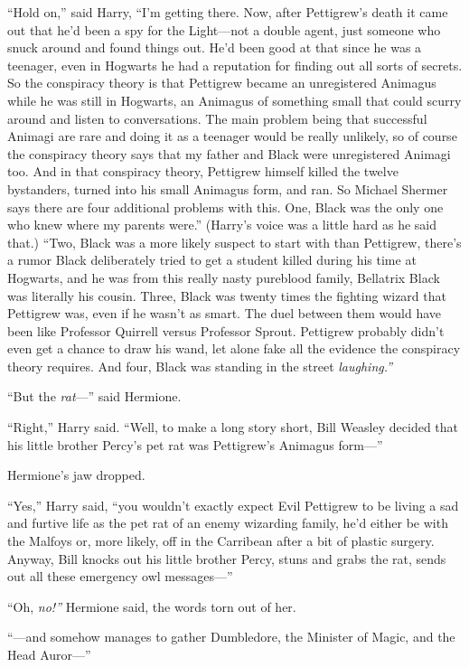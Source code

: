``Hold on,'' said Harry, ``I'm getting there. Now, after Pettigrew's
death it came out that he'd been a spy for the Light---not a double
agent, just someone who snuck around and found things out. He'd been
good at that since he was a teenager, even in Hogwarts he had a
reputation for finding out all sorts of secrets. So the conspiracy
theory is that Pettigrew became an unregistered Animagus while he was
still in Hogwarts, an Animagus of something small that could scurry
around and listen to conversations. The main problem being that
successful Animagi are rare and doing it as a teenager would be really
unlikely, so of course the conspiracy theory says that my father and
Black were unregistered Animagi too. And in that conspiracy theory,
Pettigrew himself killed the twelve bystanders, turned into his small
Animagus form, and ran. So Michael Shermer says there are four
additional problems with this. One, Black was the only one who knew
where my parents were.'' (Harry's voice was a little hard as he said
that.) ``Two, Black was a more likely suspect to start with than
Pettigrew, there's a rumor Black deliberately tried to get a student
killed during his time at Hogwarts, and he was from this really nasty
pureblood family, Bellatrix Black was literally his cousin. Three, Black
was twenty times the fighting wizard that Pettigrew was, even if he
wasn't as smart. The duel between them would have been like Professor
Quirrell versus Professor Sprout. Pettigrew probably didn't even get a
chance to draw his wand, let alone fake all the evidence the conspiracy
theory requires. And four, Black was standing in the street
\emph{laughing.''}

``But the \emph{rat}---'' said Hermione.

``Right,'' Harry said. ``Well, to make a long story short, Bill Weasley
decided that his little brother Percy's pet rat was Pettigrew's Animagus
form---''

Hermione's jaw dropped.

``Yes,'' Harry said, ``you wouldn't exactly expect Evil Pettigrew to be
living a sad and furtive life as the pet rat of an enemy wizarding
family, he'd either be with the Malfoys or, more likely, off in the
Carribean after a bit of plastic surgery. Anyway, Bill knocks out his
little brother Percy, stuns and grabs the rat, sends out all these
emergency owl messages---''

``Oh, \emph{no!''} Hermione said, the words torn out of her.

``---and somehow manages to gather Dumbledore, the Minister of Magic,
and the Head Auror---''

